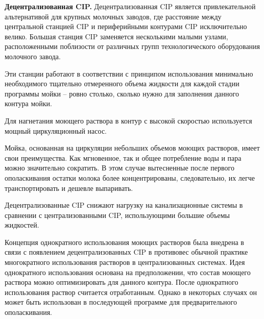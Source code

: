 {\par \redline \textbf{Децентрализованная CIP.} Децентрализованная CIP является привлекательной альтернативой для крупных молочных заводов, где расстояние между центральной станцией CIP и периферийными контурами CIP исключительно велико. Большая станция CIP заменяется несколькими малыми узлами, расположенными поблизости от различных групп технологического оборудования молочного завода.

\par \redline Эти станции работают в соответствии с принципом использования минимально необходимого тщательно отмеренного объема жидкости для каждой стадии программы мойки {--} ровно столько, сколько нужно для заполнения данного контура мойки.

\par \redline Для нагнетания моющего раствора в контур с высокой скоростью используется мощный циркуляционный насос.

\par \redline Мойка, основанная на циркуляции небольших объемов моющих растворов, имеет свои преимущества. Как мгновенное, так и общее потребление воды и пара можно значительно сократить. В этом случае вытесненные после первого ополаскивания остатки молока более концентрированы, следовательно, их легче транспортировать и дешевле выпаривать. 

\par \redline Децентрализованные CIP снижают нагрузку на канализационные системы в сравнении с централизованными CIP, использующими большие объемы жидкостей.

\par \redline Концепция однократного использования моющих растворов была внедрена в связи с появлением децентрализованных CIP в противовес обычной практике многократного использования растворов в централизованных системах. Идея однократного использования основана на предположении, что состав моющего раствора можно оптимизировать для данного контура. После однократного использования раствор считается отработанным. Однако в некоторых случаях он может быть использован в последующей программе для предварительного ополаскивания.

}
